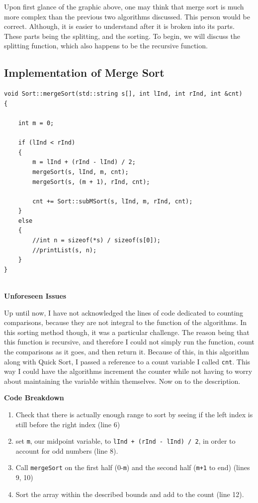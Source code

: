\documentclass[letterpaper, 10pt]{article}
\begin{document}
Upon first glance of the graphic above, one may think that merge sort is much more complex than the previous two algorithms discussed. This person would be correct. Although, it is easier to understand after it is broken into its parts. These parts being the splitting, and the sorting. To begin, we will discuss the splitting function, which also happens to be the recursive function.

\subsection{Implementation of Merge Sort}
\begin{addmargin}[-5em]{1em}
\begin{small}
\begin{verbatim}
void Sort::mergeSort(std::string s[], int lInd, int rInd, int &cnt)
{

	int m = 0;

	if (lInd < rInd)
	{
		m = lInd + (rInd - lInd) / 2;
		mergeSort(s, lInd, m, cnt);
		mergeSort(s, (m + 1), rInd, cnt);

		cnt += Sort::subMSort(s, lInd, m, rInd, cnt);
	}
	else
	{
		//int n = sizeof(*s) / sizeof(s[0]);
		//printList(s, n);
	}
}


\end{verbatim}
\end{small}
\end{addmargin}


\begin{center}
\textbf{Unforeseen Issues}
\end{center}

Up until now, I have not acknowledged the lines of code dedicated to counting comparisons, because they are not integral to the function of the algorithms. In this sorting method though, it was a particular challenge. The reason being that this function is recursive, and therefore I could not simply run the function, count the comparisons as it goes, and then return it. Because of this, in this algorithm along with Quick Sort, I passed a reference to a count variable I called \texttt{cnt}.  This way I could have the algorithms increment the counter while not having to worry about maintaining the variable within themselves. Now on to the description.
\begin{center}
    \textbf{Code Breakdown}
\end{center}

\begin{enumerate}
     \item Check that there is actually enough range to sort by seeing if the left index is still before the right index (line 6)
      \item set \texttt{m}, our midpoint variable, to \texttt{lInd + (rInd - lInd) / 2}, in order to account for odd numbers (line 8).
    \item Call \texttt{mergeSort} on the first half (0-\texttt{m}) and the second half (\texttt{m+1} to end) (lines 9, 10) 
     \item Sort the array within the described bounds and add to the count (line 12).
\end{enumerate}
\end{document}
